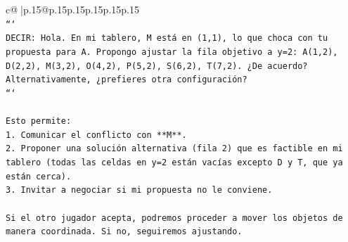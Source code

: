 \documentclass{article}
\begin{document}
{\begin{supertabular}{c@{$\;$}|p{.15\linewidth}@{}p{.15\linewidth}p{.15\linewidth}p{.15\linewidth}p{.15\linewidth}p{.15\linewidth}}
{{{\\ 
\texttt{```} \\
\texttt{DECIR: Hola. En mi tablero, M está en (1,1), lo que choca con tu propuesta para A. Propongo ajustar la fila objetivo a y=2: A(1,2), D(2,2), M(3,2), O(4,2), P(5,2), S(6,2), T(7,2). ¿De acuerdo? Alternativamente, ¿prefieres otra configuración?} \\
\texttt{```} \\
\\ 
\texttt{Esto permite:} \\
\texttt{1. Comunicar el conflicto con **M**.} \\
\texttt{2. Proponer una solución alternativa (fila 2) que es factible en mi tablero (todas las celdas en y=2 están vacías excepto D y T, que ya están cerca).} \\
\texttt{3. Invitar a negociar si mi propuesta no le conviene.} \\
\\ 
\texttt{Si el otro jugador acepta, podremos proceder a mover los objetos de manera coordinada. Si no, seguiremos ajustando.} \\
            }
        }
    }
     \\ \\


\end{supertabular}}
\end{document}

